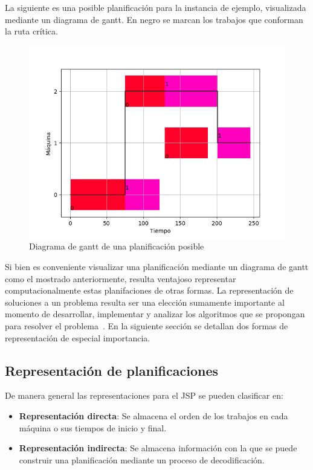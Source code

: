 La siguiente es una posible planificación para la instancia de ejemplo, visualizada mediante un diagrama de gantt. En negro se marcan los trabajos que conforman la ruta crítica. 
\begin{figure}[H]
\centering
\includegraphics[scale=.7]{Imagenes/planejemplorc.png}
\caption{Diagrama de gantt de una planificación posible}
\label{fig:gantt}
\end{figure}

Si bien es conveniente visualizar una planificación mediante un diagrama de gantt como el mostrado anteriormente, resulta ventajoso representar computacionalmente 
estas planifaciones de otras formas. 
%
La representación de soluciones a un problema resulta ser una elección sumamente importante al momento de desarrollar, implementar y analizar los algoritmos que se 
propongan para resolver el problema~\cite{rothlauf2002representations}. 
%
En la siguiente sección se detallan dos formas de representación de especial importancia.

\subsection{Representación de planificaciones}
De manera general las representaciones para el JSP se pueden clasificar en\cite{Cheng1996}:
\begin{itemize}
    \item \textbf{Representación directa}: Se almacena el orden de los trabajos en cada máquina o sus tiempos de inicio y final.
    \item \textbf{Representación indirecta}: Se almacena información con la que se puede construir una planificación mediante un proceso de decodificación.
\end{itemize}


